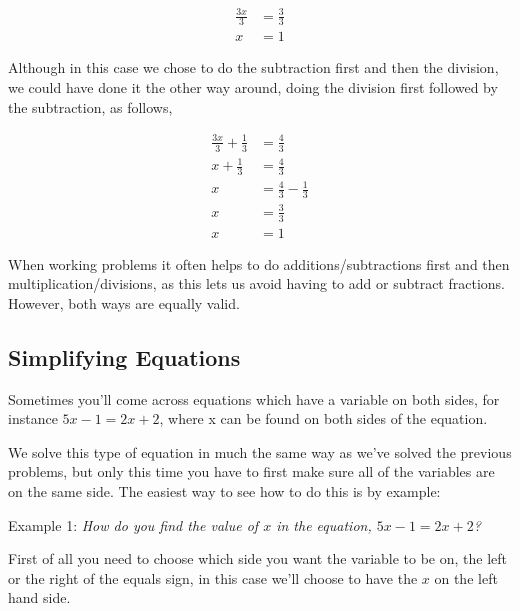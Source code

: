 \begin{align}
\frac{3x}{3} & = \frac{3}{3} \\
x & = 1
\end{align}





Although in this case we chose to do the subtraction first and then the division, we could
have done it the other way around, doing the division first followed by the subtraction,
as follows,



\begin{align}
\frac{3x}{3} + \frac{1}{3} & = \frac{4}{3} \\
x + \frac{1}{3} & = \frac{4}{3} \\
x & = \frac{4}{3} - \frac{1}{3} \\
x & = \frac{3}{3} \\
x & = 1
\end{align}





When working problems it often helps to do additions/subtractions first and then
multiplication/divisions, as this lets us avoid having to add or subtract fractions.
However, both ways are equally valid.




\subsection{Simplifying Equations}
\label{sss:simp-add9}




Sometimes you'll come across equations which have a variable on both sides, for instance
$5x-1=2x+2$, where x can be found on both sides of the equation.



We solve this type of equation in much the same way as we've solved the previous problems,
but only this time you have to first make sure all of the variables are on the same side.
The easiest way to see how to do this is by example:



Example 1: \textit{How do you find the value of $x$ in the equation, $5x-1=2x+2$?}



First of all you need to choose which side you want the variable to be on, the left or the
right of the equals sign, in this case we'll choose to have the $x$ on the left hand side.




